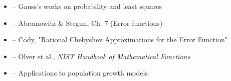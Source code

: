 \begin{itemize}
    \item \cite{gauss-works} -- Gauss's works on probability and least squares
    \item \cite{abramowitz-stegun} -- Abramowitz \& Stegun, Ch. 7 (Error functions)
    \item \cite{cody-1969} -- Cody, "Rational Chebyshev Approximations for the Error Function"
    \item \cite{olver} -- Olver et al., \textit{NIST Handbook of Mathematical Functions}
    \item \cite{population-growth} -- Applications to population growth models
\end{itemize}